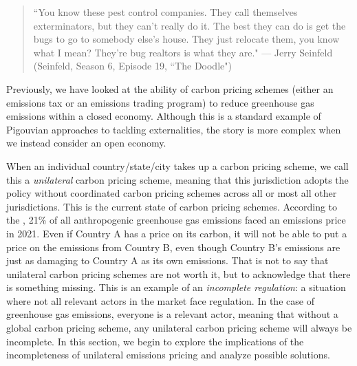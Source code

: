 \begin{quote}
	``You know these pest control companies. They call themselves exterminators, but they can't really do it. The best they can do is get the bugs to go to somebody else's house. They just relocate them, you know what I mean? They're bug realtors is what they are."
	--- Jerry Seinfeld (Seinfeld, Season 6, Episode 19, ``The Doodle")
\end{quote}
	
Previously, we have looked at the ability of carbon pricing schemes (either an emissions tax or an emissions trading program) to reduce greenhouse gas emissions within a closed economy. Although this is a standard example of Pigouvian approaches to tackling externalities, the story is more complex when we instead consider an open economy. 

When an individual country/state/city takes up a carbon pricing scheme, we call this a \emph{unilateral} carbon pricing scheme, meaning that this jurisdiction adopts the policy without coordinated carbon pricing schemes across all or most all other jurisdictions. This is the current state of carbon pricing schemes. According to the \cite{wbank}, 21\% of all anthropogenic greenhouse gas emissions faced an emissions price in 2021. Even if Country A has a price on its carbon, it will not be able to put a price on the emissions from Country B, even though Country B's emissions are just as damaging to Country A as its own emissions. That is not to say that unilateral carbon pricing schemes are not worth it, but to acknowledge that there is something missing. This is an example of an \emph{incomplete regulation}: a situation where not all relevant actors in the market face regulation. In the case of greenhouse gas emissions, everyone is a relevant actor, meaning that without a global carbon pricing scheme, any unilateral carbon pricing scheme will always be incomplete. In this section, we begin to explore the implications of the incompleteness of unilateral emissions pricing and analyze possible solutions.


